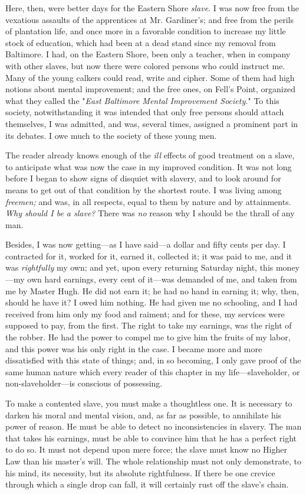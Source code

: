 Here, then, were better days for the Eastern Shore \emph{slave}. I was
now free from the vexatious assaults of
{\protect\hypertarget{319}{}{}}the apprentices at Mr. Gardiner's; and
free from the perils of plantation life, and once more in a favorable
condition to increase my little stock of education, which had been at a
dead stand since my removal from Baltimore. I had, on the Eastern Shore,
been only a teacher, when in company with other slaves, but now there
were colored persons who could instruct me. Many of the young calkers
could read, write and cipher. Some of them had high notions about mental
improvement; and the free ones, on Fell's Point, organized what they
called the "\emph{East Baltimore Mental Improvement Society.}" To this
society, notwithstanding it was intended that only free persons should
attach themselves, I was admitted, and was, several times, assigned a
prominent part in its debates. I owe much to the society of these young
men.

The reader already knows enough of the \emph{ill} effects of good
treatment on a slave, to anticipate what was now the case in my improved
condition. It was not long before I began to show signs of disquiet with
slavery, and to look around for means to get out of that condition by
the shortest route. I was living among \emph{freemen;} and was, in all
respects, equal to them by nature and by attainments. \emph{Why should I
be a slave?} There was \emph{no} reason why I should be the thrall of
any man.

Besides, I was now getting---as I have said---a dollar and fifty cents
per day. I contracted for it, worked for it, earned it, collected it; it
was paid to me, and it was \emph{rightfully} my own; and yet, upon every
returning Saturday night, this money---my
{\protect\hypertarget{320}{}{}}own hard earnings, every cent of it---was
demanded of me, and taken from me by Master Hugh. He did not earn it; he
had no hand in earning it; why, then, should he have it? I owed him
nothing. He had given me no schooling, and I had received from him only
my food and raiment; and for these, my services were supposed to pay,
from the first. The right to take my earnings, was the right of the
robber. He had the power to compel me to give him the fruits of my
labor, and this power was his only right in the case. I became more and
more dissatisfied with this state of things; and, in so becoming, I only
gave proof of the same human nature which every reader of this chapter
in my life---slaveholder, or non-slaveholder---is conscious of
possessing.

To make a contented slave, you must make a thoughtless one. It is
necessary to darken his moral and mental vision, and, as far as
possible, to annihilate his power of reason. He must be able to detect
no inconsistencies in slavery. The man that takes his earnings, must be
able to convince him that he has a perfect right to do so. It must not
depend upon mere force; the slave must know no Higher Law than his
master's will. The whole relationship must not only demonstrate, to his
mind, its necessity, but its absolute rightfulness. If there be one
crevice through which a single drop can fall, it will certainly rust off
the slave's chain.

